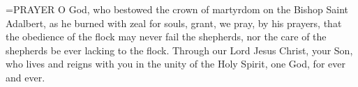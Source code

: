 \hangindent=\parindent \small{PRAYER 
O God, who bestowed the crown of martyrdom
on the Bishop Saint Adalbert,
as he burned with zeal for souls,
grant, we pray, by his prayers,
that the obedience of the flock may never fail the shepherds,
nor the care of the shepherds be ever lacking to the flock.
Through our Lord Jesus Christ, your Son,
who lives and reigns with you in the unity of the Holy Spirit,
one God, for ever and ever.\\}
 
